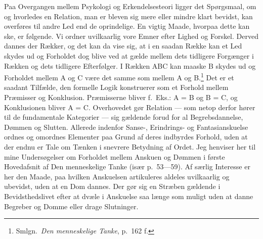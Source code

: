 \documentclass[12pt]{article}
\newcommand{\opage}[1]{\marginnote{\footnotesize\textit{[#1]}}}
\begin{document}
Paa Overgangen mellem Psykologi og Erkendelsesteori ligger det Spørgsmaal, om og
hvorledes en Relation, man er bleven sig mere eller mindre klart bevidst, kan
overføres til andre Led end de oprindelige. En vigtig Maade,
\opage{23} \setcounter{footnote}{0}%
hvorpaa dette kan ske, er følgende. Vi ordner uvilkaarlig vore Emner efter
Lighed og Forskel. Derved dannes der Rækker, og det kan da vise sig, at i en
saadan Række kan et Led skydes ud og Forholdet dog blive ved at gælde mellem
dets tidligere Forgænger i Rækken og dets tidligere Efterfølger. I Rækken ABC
kan maaske B skydes ud og Forholdet mellem A og C være det samme som mellem A og
B.\footnote{Smlgn.\ \textit{Den menneskelige Tanke}, p.~162 f.} Det er et
saadant Tilfælde, den formelle Logik konstruerer som et Forhold mellem
Præmisser og Konklusion. Præmisserne bliver f.\ Eks.: A = B og B = C, og
Konklusionen bliver A = C. Overhovedet gør Relation --- som netop derfor hører
til de fundamentale Kategorier --- sig gældende forud for al Begrebsdannelse,
Dømmen og Slutten. Allerede indenfor Sanse-, Erindrings- og Fantasianskuelse
ordnes og omordnes Elementer paa Grund af deres indbyrdes Forhold, uden at der
endnu er Tale om Tænken i snevrere Betydning af Ordet. Jeg henviser her til mine
Undersøgelser om Forholdet mellem Anskuen og Dømmen i første Hovedafsnit af
\guillemotright{}Den menneskelige Tanke\guillemotleft{} (især p.~53---59). Af
særlig Interesse er her den Maade, paa hvilken Anskuelsen artikuleres aldeles
uvilkaarlig og ubevidst, uden at en Dom dannes. Der gør sig en Stræben gældende
i Bevidsthedslivet efter at dvæle i Anskuelse saa længe som muligt uden at danne
Begreber og Domme eller drage Slutninger.
\end{document}
